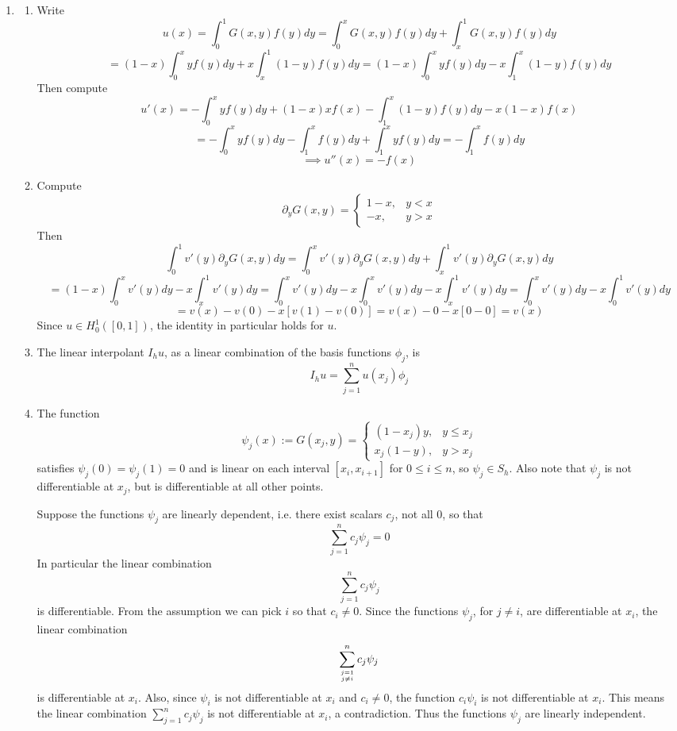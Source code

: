 \documentclass{article}
\newcommand{\imp}{\implies}
\newcommand{\ptl}{\partial}
\begin{document}
\begin{enumerate}
\item

\begin{enumerate}
	
	
	\item Write
	$$u(x) = \int_0^1 G(x,y)f(y)dy
	= \int_0^x G(x,y)f(y)dy + \int_x^1 G(x,y)f(y)dy$$
	$$= (1-x)\int_0^x yf(y)dy + x\int_x^1 (1-y)f(y)dy
	= (1-x)\int_0^x yf(y)dy - x\int_1^x (1-y)f(y)dy$$
	Then compute
	$$u'(x) = -\int_0^x yf(y)dy + (1-x)xf(x) - \int_1^x (1-y)f(y)dy - x(1-x)f(x)$$
	$$= -\int_0^x yf(y)dy - \int_1^x f(y)dy + \int_1^x yf(y)dy
	= -\int_1^x f(y)dy$$
	$$\imp u''(x) = -f(x)$$
	
	
	\item Compute
	$$\ptl_yG(x,y) =
	\begin{cases}
		1-x, & y<x\\
		-x, & y>x
	\end{cases}$$
	Then
	$$\int_0^1 v'(y)\ptl_yG(x,y)dy = \int_0^x v'(y)\ptl_yG(x,y)dy + \int_x^1 v'(y)\ptl_yG(x,y)dy$$
	$$= (1-x)\int_0^x v'(y)dy - x\int_x^1 v'(y)dy
	= \int_0^x v'(y)dy - x\int_0^x v'(y)dy - x\int_x^1 v'(y)dy
	= \int_0^x v'(y)dy - x\int_0^1 v'(y)dy$$
	$$= v(x) - v(0) - x[v(1) - v(0)]
	= v(x) - 0 - x[0 - 0]
	= v(x)$$
	Since $u\in H^1_0([0,1])$, the identity in particular holds for $u$.
	
	
	\item The linear interpolant $I_hu$, as a linear combination of the basis functions $\phi_j$, is
	$$I_hu = \sum_{j=1}^n u(x_j)\phi_j$$
	
	
	\item The function
	$$\psi_j(x) := G(x_j,y) =
	\begin{cases}
		(1-x_j)y, & y\le x_j\\
		x_j(1-y), & y>x_j
	\end{cases}$$
	satisfies $\psi_j(0)=\psi_j(1)=0$ and is linear on each interval $[x_i,x_{i+1}]$ for $0\le i\le n$, so $\psi_j\in S_h$. Also note that $\psi_j$ is not differentiable at $x_j$, but is differentiable at all other points.
	
	Suppose the functions $\psi_j$ are linearly dependent, i.e. there exist scalars $c_j$, not all 0, so that
	$$\sum_{j=1}^nc_j\psi_j=0$$
	In particular the linear combination
	$$\sum_{j=1}^nc_j\psi_j$$
	is differentiable. From the assumption we can pick $i$ so that $c_i\ne0$. Since the functions $\psi_j$, for $j\ne i$, are differentiable at $x_i$, the linear combination
	$$\sum_{j=1 \atop j\ne i}^n c_j\psi_j$$
	is differentiable at $x_i$. Also, since $\psi_i$ is not differentiable at $x_i$ and $c_i\ne0$, the function $c_i\psi_i$ is not differentiable at $x_i$. This means the linear combination $\sum_{j=1}^nc_j\psi_j$ is not differentiable at $x_i$, a contradiction. Thus the functions $\psi_j$ are linearly independent.
	

\end{enumerate}
\end{enumerate}
\end{document}
